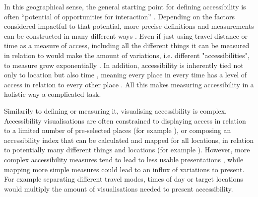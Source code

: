 In this geographical sense,
the general starting point for defining accessibility is often
\enquote{potential of opportunities for interaction} \parencite{han1959}.  %
Depending on the factors considered impactful to that potential,
more precise definitions and measurements can be constructed in many different ways
\parencite{pap2016}.
Even if just using travel distance or time as a measure of access,
including all the different things it can be measured in relation to
would make the amount of variations, i.e. different "accessibilities",
to measure grow exponentially \parencite{lev2020}.
In addition, accessibility is inherently tied not only to location
but also time \parencite{jar2018},
meaning every place in every time has a level of access
in relation to every other place \parencite{lev2020}.
All this makes measuring accessibility in a holistic way a complicated task.

Similarily to defining or measuring it, visualising accessibility is complex.
Accessibility visualisations are often constrained to displaying access in relation to
a limited number of pre-selected places (for example \textcite{wei2018}),
or composing an accessibility index that can be calculated and mapped for all locations,
in relation to potentially many different things and locations (for example \textcite{kim2019}).
However, more complex accessibility measures tend to lead to
less usable presentations \parencite{te2014},
while mapping more simple measures could lead to an influx of variations to present.
For example separating different travel modes, times of day or target locations
would multiply the amount of visualisations needed to present accessibility.


